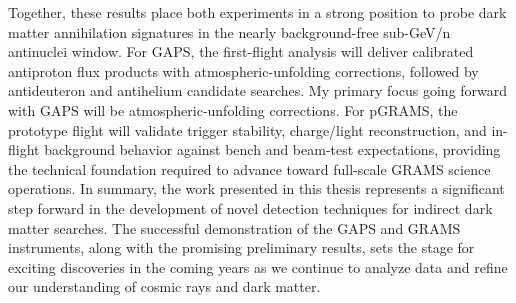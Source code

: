 Together, these results place both experiments in a strong position to probe dark matter annihilation signatures in the nearly background-free sub-GeV/n antinuclei window. For \ac{GAPS}, the first-flight analysis will deliver calibrated antiproton flux products with atmospheric-unfolding corrections, followed by antideuteron and antihelium candidate searches. My primary focus going forward with \ac{GAPS} will be atmospheric-unfolding corrections. For \ac{pGRAMS}, the prototype flight will validate trigger stability, charge/light reconstruction, and in-flight background behavior against bench and beam-test expectations, providing the technical foundation required to advance toward full-scale \ac{GRAMS} science operations.
In summary, the work presented in this thesis represents a significant step forward in the development of novel detection techniques for indirect dark matter searches. The successful demonstration of the \ac{GAPS} and \ac{GRAMS} instruments, along with the promising preliminary results, sets the stage for exciting discoveries in the coming years as we continue to analyze data and refine our understanding of cosmic rays and dark matter.